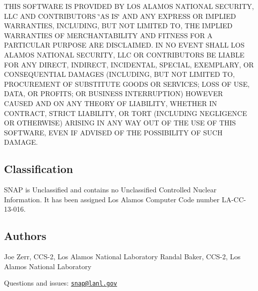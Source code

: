 T\-H\-I\-S S\-O\-F\-T\-W\-A\-R\-E I\-S P\-R\-O\-V\-I\-D\-E\-D B\-Y L\-O\-S A\-L\-A\-M\-O\-S N\-A\-T\-I\-O\-N\-A\-L S\-E\-C\-U\-R\-I\-T\-Y, L\-L\-C A\-N\-D C\-O\-N\-T\-R\-I\-B\-U\-T\-O\-R\-S \char`\"{}\-A\-S I\-S\char`\"{} A\-N\-D A\-N\-Y E\-X\-P\-R\-E\-S\-S O\-R I\-M\-P\-L\-I\-E\-D W\-A\-R\-R\-A\-N\-T\-I\-E\-S, I\-N\-C\-L\-U\-D\-I\-N\-G, B\-U\-T N\-O\-T L\-I\-M\-I\-T\-E\-D T\-O, T\-H\-E I\-M\-P\-L\-I\-E\-D W\-A\-R\-R\-A\-N\-T\-I\-E\-S O\-F M\-E\-R\-C\-H\-A\-N\-T\-A\-B\-I\-L\-I\-T\-Y A\-N\-D F\-I\-T\-N\-E\-S\-S F\-O\-R A P\-A\-R\-T\-I\-C\-U\-L\-A\-R P\-U\-R\-P\-O\-S\-E A\-R\-E D\-I\-S\-C\-L\-A\-I\-M\-E\-D. I\-N N\-O E\-V\-E\-N\-T S\-H\-A\-L\-L L\-O\-S A\-L\-A\-M\-O\-S N\-A\-T\-I\-O\-N\-A\-L S\-E\-C\-U\-R\-I\-T\-Y, L\-L\-C O\-R C\-O\-N\-T\-R\-I\-B\-U\-T\-O\-R\-S B\-E L\-I\-A\-B\-L\-E F\-O\-R A\-N\-Y D\-I\-R\-E\-C\-T, I\-N\-D\-I\-R\-E\-C\-T, I\-N\-C\-I\-D\-E\-N\-T\-A\-L, S\-P\-E\-C\-I\-A\-L, E\-X\-E\-M\-P\-L\-A\-R\-Y, O\-R C\-O\-N\-S\-E\-Q\-U\-E\-N\-T\-I\-A\-L D\-A\-M\-A\-G\-E\-S (I\-N\-C\-L\-U\-D\-I\-N\-G, B\-U\-T N\-O\-T L\-I\-M\-I\-T\-E\-D T\-O, P\-R\-O\-C\-U\-R\-E\-M\-E\-N\-T O\-F S\-U\-B\-S\-T\-I\-T\-U\-T\-E G\-O\-O\-D\-S O\-R S\-E\-R\-V\-I\-C\-E\-S; L\-O\-S\-S O\-F U\-S\-E, D\-A\-T\-A, O\-R P\-R\-O\-F\-I\-T\-S; O\-R B\-U\-S\-I\-N\-E\-S\-S I\-N\-T\-E\-R\-R\-U\-P\-T\-I\-O\-N) H\-O\-W\-E\-V\-E\-R C\-A\-U\-S\-E\-D A\-N\-D O\-N A\-N\-Y T\-H\-E\-O\-R\-Y O\-F L\-I\-A\-B\-I\-L\-I\-T\-Y, W\-H\-E\-T\-H\-E\-R I\-N C\-O\-N\-T\-R\-A\-C\-T, S\-T\-R\-I\-C\-T L\-I\-A\-B\-I\-L\-I\-T\-Y, O\-R T\-O\-R\-T (I\-N\-C\-L\-U\-D\-I\-N\-G N\-E\-G\-L\-I\-G\-E\-N\-C\-E O\-R O\-T\-H\-E\-R\-W\-I\-S\-E) A\-R\-I\-S\-I\-N\-G I\-N A\-N\-Y W\-A\-Y O\-U\-T O\-F T\-H\-E U\-S\-E O\-F T\-H\-I\-S S\-O\-F\-T\-W\-A\-R\-E, E\-V\-E\-N I\-F A\-D\-V\-I\-S\-E\-D O\-F T\-H\-E P\-O\-S\-S\-I\-B\-I\-L\-I\-T\-Y O\-F S\-U\-C\-H D\-A\-M\-A\-G\-E.

\subsection*{Classification}

S\-N\-A\-P is Unclassified and contains no Unclassified Controlled Nuclear Information. It has been assigned Los Alamos Computer Code number L\-A-\/\-C\-C-\/13-\/016.

\subsection*{Authors}

Joe Zerr, C\-C\-S-\/2, Los Alamos National Laboratory Randal Baker, C\-C\-S-\/2, Los Alamos National Laboratory

Questions and issues\-: \href{mailto:snap@lanl.gov}{\tt snap@lanl.\-gov} 